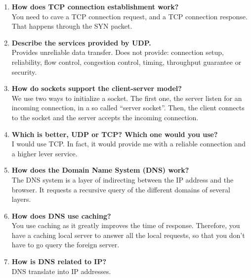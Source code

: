 \documentclass[a4paper]{article}
\begin{document}
\begin{enumerate}
  \item {\bf How does TCP connection establishment work? }\\
    You need to cave a TCP connection request, and a TCP connection response. That happens through the SYN packet.

  \item {\bf Describe the services provided by UDP.} \\
    Provides unreliable data transfer. Does not provide: connection setup, reliability, flow control, congestion control, timing, throughput guarantee or security.

  \item {\bf How do sockets support the client-server model? }\\
    We use two ways to initialize a socket. The first one, the server listen for an incoming connection, in a so called ``server socket''. Then, the client connects to the socket and the server accepts the incoming connection.

  \item {\bf Which is better, UDP or TCP? Which one would you use?} \\
    I would use TCP. In fact, it would provide me with a reliable connection and a higher lever service.

  \item {\bf How does the Domain Name System (DNS) work? }\\
    The DNS system is a layer of indirecting between the IP address and the browser. It requests a recursive query of the different domains of several layers.
  \item {\bf How does DNS use caching?} \\
    You use caching as it greatly improves the time of response. Therefore, you have a caching local server to answer all the local requests, so that you don't have to go query the foreign server.

  \item {\bf How is DNS related to IP? }\\
    DNS translate into IP addresses.
\end{enumerate}
\end{document}
